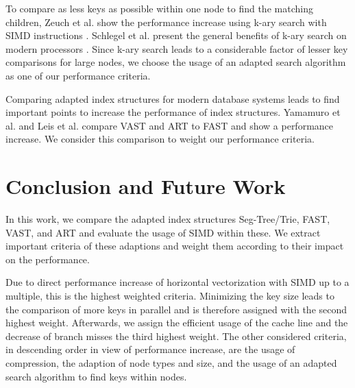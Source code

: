 \documentclass[conference]{IEEEtran}
\begin{document}
To compare as less keys as possible within one node to find the matching children, Zeuch et al. show the performance increase using k-ary search with SIMD instructions \cite{b3}. Schlegel et al. present the general benefits of k-ary search on modern processors \cite{b14}. Since k-ary search leads to a considerable factor of lesser key comparisons for large nodes, we choose the usage of an adapted search algorithm as one of our performance criteria.

Comparing adapted index structures for modern database systems leads to find important points to increase the performance of index structures. Yamamuro et al. and Leis et al. compare VAST \cite{b5} and ART \cite{b4} to FAST and show a performance increase. We consider this comparison to weight our performance criteria.

\section{Conclusion and Future Work}


In this work, we compare the adapted index structures Seg-Tree/Trie, FAST, VAST, and ART and evaluate the usage of SIMD within these. We extract important criteria of these adaptions and weight them according to their impact on the performance.

Due to direct performance increase of horizontal vectorization with SIMD up to a multiple, this is the highest weighted criteria. Minimizing the key size leads to the comparison of more keys in parallel and is therefore assigned with the second highest weight. Afterwards, we assign the efficient usage of the cache line and the decrease of branch misses the third highest weight. The other considered criteria, in descending order in view of performance increase, are the usage of compression, the adaption of node types and size, and the usage of an adapted search algorithm to find keys within nodes. 
\end{document}
